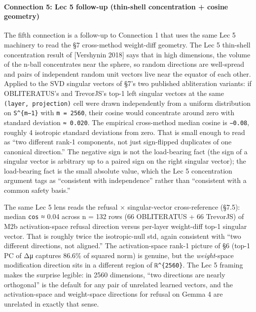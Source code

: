 \documentclass[
  11pt,
]{article}
\begin{document}
\paragraph{Connection 5: Lec 5 follow-up (thin-shell concentration +
cosine
geometry)}\label{connection-5-lec-5-follow-up-thin-shell-concentration-cosine-geometry}

The fifth connection is a follow-up to Connection 1 that uses the same
Lec 5 machinery to read the §7 cross-method weight-diff geometry. The
Lec 5 thin-shell concentration result of {[}Vershynin 2018{]} says that
in high dimensions, the volume of the n-ball concentrates near the
sphere, so random directions are well-spread and pairs of independent
random unit vectors live near the equator of each other. Applied to the
SVD singular vectors of §7's two published abliteration variants: if
OBLITERATUS's and TrevorJS's top-1 left singular vectors at the same
\texttt{(layer,\ projection)} cell were drawn independently from a
uniform distribution on \texttt{S\^{}\{m−1\}} with \texttt{m\ =\ 2560},
their cosine would concentrate around zero with standard deviation
\texttt{≈\ 0.020}. The empirical cross-method median cosine is
\texttt{−0.08}, roughly 4 isotropic standard deviations from zero. That
is small enough to read as ``two different rank-1 components, not just
sign-flipped duplicates of one canonical direction.'' The negative sign
is not the load-bearing fact (the sign of a singular vector is arbitrary
up to a paired sign on the right singular vector); the load-bearing fact
is the small absolute value, which the Lec 5 concentration argument tags
as ``consistent with independence'' rather than ``consistent with a
common safety basis.''

The same Lec 5 lens reads the refusal × singular-vector cross-reference
(§7.5): median \texttt{\textbar{}cos\textbar{}} ≈ 0.04 across n = 132
rows (66 OBLITERATUS + 66 TrevorJS) of M2b activation-space refusal
direction versus per-layer weight-diff top-1 singular vector. That is
roughly twice the isotropic-null std, again consistent with ``two
different directions, not aligned.'' The activation-space rank-1 picture
of §6 (top-1 PC of Δμ captures 86.6\% of squared norm) is genuine, but
the \emph{weight}-space modification direction sits in a different
region of \texttt{ℝ\^{}\{2560\}}. The Lec 5 framing makes the surprise
legible: in 2560 dimensions, ``two directions are nearly orthogonal'' is
the default for any pair of unrelated learned vectors, and the
activation-space and weight-space directions for refusal on Gemma 4 are
unrelated in exactly that sense.
\end{document}
